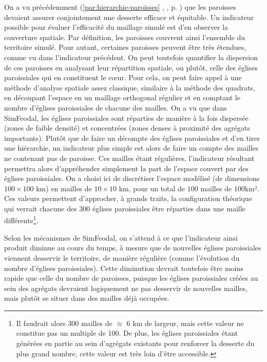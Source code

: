 On a vu précédemment (\ref{par:hierarchie-paroisses} , , p. \pageref{par:hierarchie-paroisses}) que les paroisses devaient assurer conjointement une desserte efficace et équitable.
Un indicateur possible pour évaluer l'efficacité du maillage simulé est d'en observer la couverture spatiale.
Par définition, les paroisses couvrent ainsi l'ensemble du territoire simulé.
Pour autant, certaines paroisses peuvent être très étendues, comme vu dans l'indicateur précédent.
On peut toutefois quantifier la dispersion de ces paroisses en analysant leur répartition spatiale, ou plutôt, celle des églises paroissiales qui en constituent le cœur.
Pour cela, on peut faire appel à une méthode d'analyse spatiale assez classique, similaire à la méthode des quadrats, en découpant l'espace en un maillage orthogonal régulier et en comptant le nombre d'églises paroissiales de chacune des mailles.
On a vu que dans SimFeodal, les églises paroissiales sont réparties de manière à la fois dispersée (zones de faible densité) et concentrées (zones denses à proximité des agrégats importants).
Plutôt que de faire un décompte des églises paroissiales et d'en tirer une hiérarchie, un indicateur plus simple est alors de faire un compte des mailles ne contenant pas de paroisse. Ces mailles étant régulières, l'indicateur résultant permettra alors d'appréhender simplement la part de l'espace couvert par des églises paroissiales.
On a choisi ici de discrétiser l'espace modélisé (de dimensions $100\times100$ km) en mailles de $10\times10$ km, pour un total de $100$ mailles de $100$km².
Ces valeurs permettent d'approcher, à grands traits, la configuration théorique qui verrait chacune des 300 églises paroissiales être réparties dans une maille différente\footnote{Il faudrait alors 300 mailles de $\approx$ 6 km de largeur, mais cette valeur ne constitue pas un multiple de 100. De plus, les églises paroissiales étant générées en partie au sein d'agrégats existants pour renforcer la desserte du plus grand nombre, cette valeur est très loin d'être accessible.}.

Selon les mécanismes de SimFeodal, on s'attend à ce que l'indicateur ainsi produit diminue au cours du temps, à mesure que de nouvelles églises paroissiales viennent desservir le territoire, de manière régulière (comme l'évolution du nombre d'églises paroissiales).
Cette diminution devrait toutefois être moins rapide que celle du nombre de paroisses, puisque les églises paroissiales créées au sein des agrégats devraient logiquement ne pas desservir de nouvelles mailles, mais plutôt se situer dans des mailles déjà occupées.

